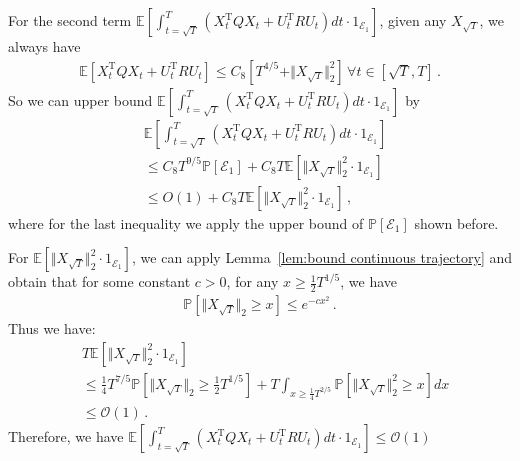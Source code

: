 \documentclass{article}
\theoremstyle{definition}
\begin{document}
For the second term $\mathbb{E}\left[\int_{t=\sqrt{T}}^{T}\left(X^{\mathrm{T}}_{t}QX_{t}+U^{\mathrm{T}}_{t}RU_{t}\right)dt\cdot 1_{\mathcal{E}_{1}} \right]$, given any $X_{\sqrt{T}}$, we always have
\begin{align*}
\mathbb{E}\left[X^{\mathrm{T}}_{t}QX_{t}+U^{\mathrm{T}}_{t}RU_{t}\right]\leq C_{8}\left[T^{4/5}+\Vert X_{\sqrt{T}}\Vert^{2}_{2}\right]\, \forall t\in[\sqrt{T},T]\,.
\end{align*}
So we can upper bound $\mathbb{E}\left[\int_{t=\sqrt{T}}^{T}\left(X^{\mathrm{T}}_{t}QX_{t}+U^{\mathrm{T}}_{t}RU_{t}\right)dt\cdot 1_{\mathcal{E}_{1}} \right]$ by
\begin{align*}
&\mathbb{E}\left[\int_{t=\sqrt{T}}^{T}\left(X^{\mathrm{T}}_{t}QX_{t}+U^{\mathrm{T}}_{t}RU_{t}\right)dt\cdot 1_{\mathcal{E}_{1}} \right]\\
&\leq C_{8}T^{9/5}\mathbb{P}[\mathcal{E}_{1}]+C_{8}T\mathbb{E}\left[\Vert X_{\sqrt{T}}\Vert^{2}_{2}\cdot 1_{\mathcal{E}_{1}}\right]\\
&\leq O(1)+C_{8}T\mathbb{E}\left[\Vert X_{\sqrt{T}}\Vert^{2}_{2}\cdot 1_{\mathcal{E}_{1}}\right]\,,
\end{align*}
where for the last inequality we apply the upper bound of $\mathbb{P}[\mathcal{E}_{1}]$ shown before.

For $\mathbb{E}\left[\Vert X_{\sqrt{T}}\Vert^{2}_{2}\cdot 1_{\mathcal{E}_{1}}\right]$, we can apply Lemma~\ref{lem:bound continuous trajectory} and obtain that for some constant $c>0$, for any $x\geq\frac{1}{2}T^{1/5}$, we have
\begin{align*}
\mathbb{P}\left[\Vert X_{\sqrt{T}}\Vert_{2}\geq x\right]\leq e^{-cx^{2}}\,.
\end{align*}
Thus we have:
\begin{align*}
&T\mathbb{E}\left[\Vert X_{\sqrt{T}}\Vert^{2}_{2}\cdot 1_{\mathcal{E}_{1}}\right]\\
&\leq\frac{1}{4}T^{7/5}\mathbb{P}\left[\Vert X_{\sqrt{T}}\Vert_{2}\geq\frac{1}{2}T^{1/5}\right] +T\int_{x\geq \frac{1}{4}T^{2/5}}\mathbb{P}\left[\Vert X_{\sqrt{T}}\Vert^{2}_{2}\geq x\right]dx\\
&\leq \mathcal{O}(1)\,.
\end{align*}
Therefore, we have $\mathbb{E}\left[\int_{t=\sqrt{T}}^{T}\left(X^{\mathrm{T}}_{t}QX_{t}+U^{\mathrm{T}}_{t}RU_{t}\right)dt\cdot 1_{\mathcal{E}_{1}} \right]\leq \mathcal{O}(1)$
\end{document}
